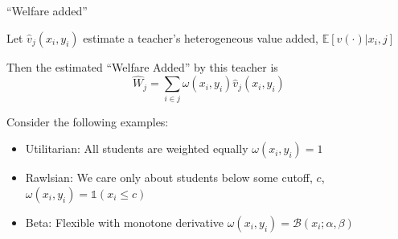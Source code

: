 \documentclass[t,aspectratio=169,11pt]{beamer}
\begin{document}

\begin{frame}{``Welfare added''}

\begin{wideitemize}

    \item Let $\hat{v}_j(x_i,y_i)$ estimate a teacher's heterogeneous value added, $\mathbb{E}[v(\cdot)|x_i,j]$
    
    \item Then the estimated ``Welfare Added'' by this teacher is  
    \[
    \hat{W}_j  = \sum_{i\in j} \omega(x_i,y_i) \hat{v}_j(x_i,y_i) 
    \] 
    
    \item Consider the following examples:
    \begin{itemize}
        \item Utilitarian: All students are weighted equally $\omega(x_i,y_i) = 1$
        \item Rawlsian: We care only about students below some cutoff, $c$, $\omega(x_i,y_i) = \mathds{1}(x_i\leq c)$
        \item Beta: Flexible with monotone derivative $ \omega(x_i,y_i)=  \mathcal{B}(x_i;\alpha,\beta)$ 
        
    \end{itemize}
    

\end{wideitemize}


\end{frame}


\end{document}
